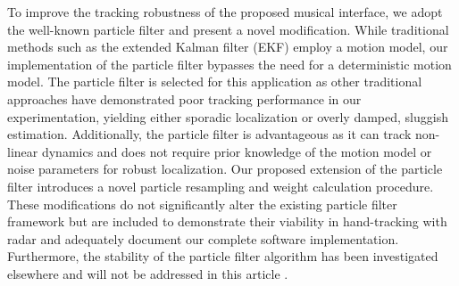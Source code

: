 \documentclass[10pt,journal,final]{IEEEtran}
\begin{document}
To improve the tracking robustness of the proposed musical interface, we adopt the well-known particle filter \cite{tracking:condensation_algorithm_radar} and present a novel modification. 
While traditional methods such as the extended Kalman filter (EKF) employ a motion model, our implementation of the particle filter bypasses the need for a deterministic motion model.
The particle filter is selected for this application as other traditional approaches have demonstrated poor tracking performance in our experimentation, yielding either sporadic localization or overly damped, sluggish estimation.
Additionally, the particle filter is advantageous as it can track non-linear dynamics and does not require prior knowledge of the motion model or noise parameters for robust localization.
Our proposed extension of the particle filter introduces a novel particle resampling and weight calculation procedure.
These modifications do not significantly alter the existing particle filter framework but are included to demonstrate their viability in hand-tracking with radar and adequately document our complete software implementation.
Furthermore, the stability of the particle filter algorithm has been investigated elsewhere and will not be addressed in this article \cite{le2004stability}.
\end{document}
